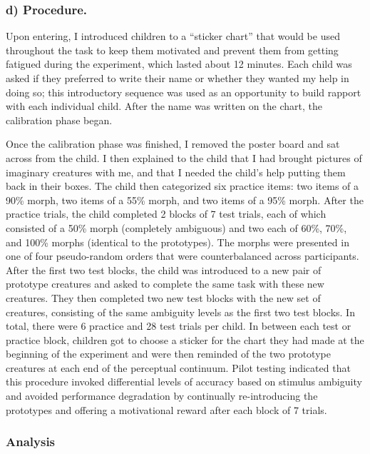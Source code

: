 \documentclass[,man,floatsintext]{apa6}
\begin{document}
\hypertarget{d-procedure.}{%
\subsubsection{d) Procedure.}\label{d-procedure.}}

Upon entering, I introduced children to a \enquote{sticker chart} that would be used throughout the task to keep them motivated and prevent them from getting fatigued during the experiment, which lasted about 12 minutes. Each child was asked if they preferred to write their name or whether they wanted my help in doing so; this introductory sequence was used as an opportunity to build rapport with each individual child. After the name was written on the chart, the calibration phase began.

Once the calibration phase was finished, I removed the poster board and sat across from the child. I then explained to the child that I had brought pictures of imaginary creatures with me, and that I needed the child's help putting them back in their boxes. The child then categorized six practice items: two items of a 90\% morph, two items of a 55\% morph, and two items of a 95\% morph. After the practice trials, the child completed 2 blocks of 7 test trials, each of which consisted of a 50\% morph (completely ambiguous) and two each of 60\%, 70\%, and 100\% morphs (identical to the prototypes). The morphs were presented in one of four pseudo-random orders that were counterbalanced across participants. After the first two test blocks, the child was introduced to a new pair of prototype creatures and asked to complete the same task with these new creatures. They then completed two new test blocks with the new set of creatures, consisting of the same ambiguity levels as the first two test blocks. In total, there were 6 practice and 28 test trials per child. In between each test or practice block, children got to choose a sticker for the chart they had made at the beginning of the experiment and were then reminded of the two prototype creatures at each end of the perceptual continuum. Pilot testing indicated that this procedure invoked differential levels of accuracy based on stimulus ambiguity and avoided performance degradation by continually re-introducing the prototypes and offering a motivational reward after each block of 7 trials.

\hypertarget{analysis}{%
\subsubsection{Analysis}\label{analysis}}
\end{document}
